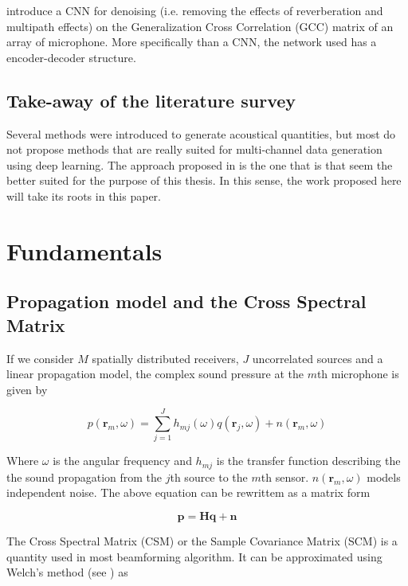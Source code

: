 \documentclass[11pt,a4paper,twoside]{report}
\begin{document}
\cite{vera2021acoustic} introduce a CNN for denoising (i.e. removing the effects of reverberation and multipath effects) on the Generalization Cross Correlation (GCC) matrix of an array of microphone. More specifically than a CNN, the network used has a encoder-decoder structure.

\subsection{Take-away of the literature survey}

Several methods were introduced to generate acoustical quantities, but most do not propose methods that are really suited for multi-channel data generation using deep learning. The approach proposed in \cite{gerstoft2020parametric} is the one that is that seem the better suited for the purpose of this thesis. In this sense, the work proposed here will take its roots in this paper. 

\section{Fundamentals}

\subsection{Propagation model and the Cross Spectral Matrix}

If we consider $M$ spatially distributed receivers, $J$ uncorrelated sources and a linear propagation model, the complex sound pressure at the $m$th microphone is given by

\begin{equation}
    p(\mathbf{r}_m, \omega) = \sum_{j = 1}^{J} h_{mj}(\omega)q(\mathbf{r}_j, \omega) + n(\mathbf{r}_m, \omega)
\end{equation}

Where $\omega$ is the angular frequency and $h_{mj}$ is the transfer function  describing the  the sound propagation from the $j$th source to the $m$th sensor. $n(\mathbf{r}_m, \omega)$ models independent noise. The above equation can be rewrittem as a matrix form

\begin{equation}
    \mathbf{p} = \mathbf{H} \mathbf{q} + \mathbf{n}
\end{equation}

The Cross Spectral Matrix (CSM) or the Sample Covariance Matrix (SCM) is a quantity used in most beamforming algorithm. It can be approximated using Welch's method (see \cite{welch1967use}) as
\end{document}
